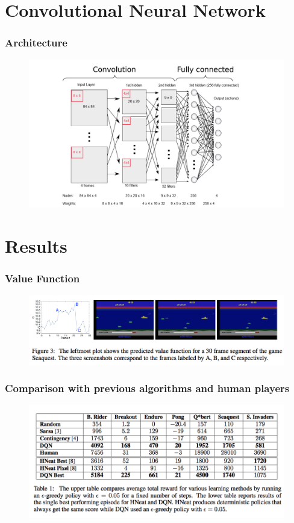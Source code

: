 \documentclass[12pt]{beamer}
\begin{document}
\section{Convolutional Neural Network}
\begin{frame}
\frametitle{Architecture}
\begin{figure}[h]
\includegraphics[scale=.3]{NN.png}
\end{figure}
\end{frame}

\section{Results}
\begin{frame}
\frametitle{Value Function}
\begin{figure}[h]
\centering
\includegraphics[scale=.3]{sub.png}
\end{figure}
\end{frame}

\begin{frame}
\frametitle{Comparison with previous algorithms and human players}
\begin{figure}[h]
\centering
\includegraphics[scale=.35]{Results.png}
\end{figure}
\end{frame}
\end{document}
